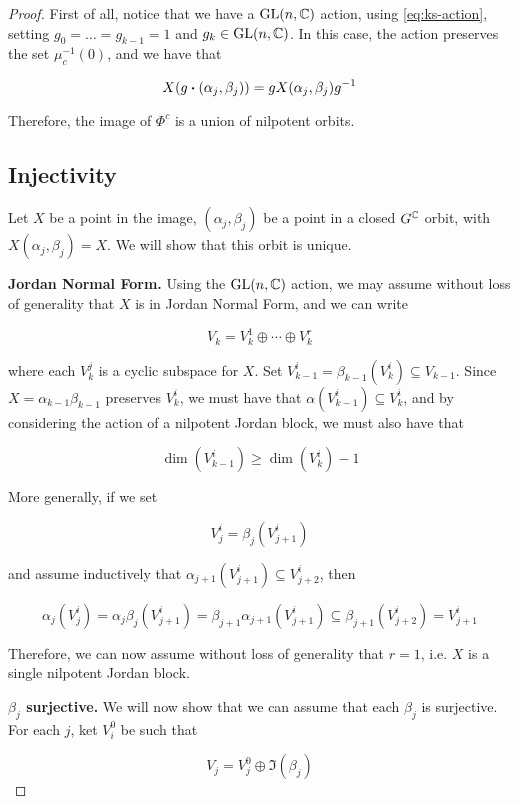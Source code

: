 \documentclass{report}
\begin{document}
\begin{proof}
    First of all, notice that we have a \(\operatorname{GL}(n, \mathbb{C})\) action, using \cref{eq:ks-action}, setting \(g_0 = \dots = g_{k-1} = 1\) and \(g_k \in \operatorname{GL}(n, \mathbb{C})\). In this case, the action preserves the set \(\mu_c^{-1}(0)\), and we have that

    \[X(g \vdot (\alpha_j, \beta_j)) = g X(\alpha_j, \beta_j)g^{-1}\]

    Therefore, the image of \(\Phi^c\) is a union of nilpotent orbits.

    \subsection{Injectivity}
    
    Let \(X\) be a point in the image, \((\alpha_j, \beta_j)\) be a point in a closed \(G^{\mathbb{C}}\) orbit, with \(X(\alpha_j, \beta_j) = X\). We will show that this orbit is unique. 
    
    \textbf{Jordan Normal Form.} Using the \(\operatorname{GL}(n, \mathbb{C})\) action, we may assume without loss of generality that \(X\) is in Jordan Normal Form, and we can write

    \[V_k = V_k^1 \oplus \cdots \oplus V_k^r\]

    where each \(V_k^j\) is a cyclic subspace for \(X\). Set \(V_{k-1}^i = \beta_{k-1}(V_k^i) \subseteq V_{k-1}\). Since \(X = \alpha_{k-1}\beta_{k-1}\) preserves \(V_k^i\), we must have that \(\alpha(V_{k-1}^i) \subseteq V_k^i\), and by considering the action of a nilpotent Jordan block, we must also have that

    \[\dim(V_{k-1}^i) \ge \dim(V_k^i) - 1\]

    More generally, if we set

    \[V_j^i = \beta_j(V_{j+1}^i)\]

    and assume inductively that \(\alpha_{j+1}(V_{j+1}^i)\subseteq V_{j+2}^i\), then

    \[\alpha_j(V_j^i) = \alpha_j\beta_j(V_{j+1}^i) = \beta_{j+1}\alpha_{j+1}(V_{j+1}^i) \subseteq \beta_{j+1}(V_{j+2}^i) = V_{j+1}^i\]

    Therefore, we can now assume without loss of generality that \(r = 1\), i.e. \(X\) is a single nilpotent Jordan block.

    \textbf{\(\beta_j\) surjective.} We will now show that we can assume that each \(\beta_j\) is surjective. For each \(j\), ket \(V_i^0\) be such that

    \[V_j = V_j^0 \oplus \Im(\beta_j)\]


\end{proof}
\end{document}
